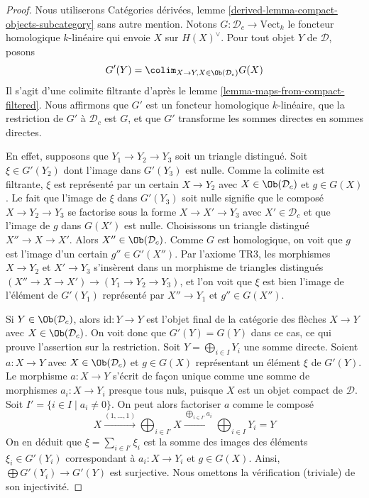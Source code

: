 \begin{proof}
Nous utiliserons Catégories dérivées, lemme
\ref{derived-lemma-compact-objects-subcategory} sans autre mention.
Notons $G : \mathcal{D}_c \to \text{Vect}_k$ le foncteur homologique
$k$-linéaire qui envoie $X$ sur $H(X)^\vee$. Pour tout objet $Y$ de $\mathcal{D}$,
posons
$$
G'(Y) = \colim_{X \to Y, X \in \Ob(\mathcal{D}_c)} G(X)
$$
Il s'agit d'une colimite filtrante d'après le lemme \ref{lemma-maps-from-compact-filtered}.
Nous affirmons que $G'$ est un foncteur homologique $k$-linéaire,
que la restriction de $G'$ à $\mathcal{D}_c$ est $G$, et que $G'$
transforme les sommes directes en sommes directes.

\medskip\noindent
En effet, supposons que $Y_1 \to Y_2 \to Y_3$ soit un triangle distingué.
Soit $\xi \in G'(Y_2)$ dont l'image dans $G'(Y_3)$ est nulle. Comme la colimite est
filtrante, $\xi$ est représenté par un certain $X \to Y_2$ avec
$X \in \Ob(\mathcal{D}_c)$ et $g \in G(X)$.
Le fait que l'image de $\xi$ dans $G'(Y_3)$ soit nulle signifie que le composé
$X \to Y_2 \to Y_3$ se factorise sous la forme $X \to X' \to Y_3$ avec $X' \in \mathcal{D}_c$
et que l'image de $g$ dans $G(X')$ est nulle. Choisissons un triangle distingué
$X'' \to X \to X'$. Alors $X'' \in \Ob(\mathcal{D}_c)$.
Comme $G$ est homologique, on voit que $g$ est l'image d'un certain
$g'' \in G'(X'')$. Par l'axiome TR3, les morphismes $X \to Y_2$ et $X' \to Y_3$ s'insèrent dans
un morphisme de triangles distingués
$(X'' \to X \to X') \to (Y_1 \to Y_2 \to Y_3)$,
et l'on voit que $\xi$ est bien l'image de
l'élément de $G'(Y_1)$ représenté par $X'' \to Y_1$ et $g'' \in G(X'')$.

\medskip\noindent
Si $Y \in \Ob(\mathcal{D}_c)$, alors $\text{id} : Y \to Y$ est l'objet final
de la catégorie des flèches $X \to Y$ avec $X \in \Ob(\mathcal{D}_c)$.
On voit donc que $G'(Y) = G(Y)$ dans ce cas, ce qui prouve l'assertion
sur la restriction. Soit $Y = \bigoplus_{i \in I} Y_i$
une somme directe. Soient $a : X \to Y$ avec $X \in \Ob(\mathcal{D}_c)$
et $g \in G(X)$ représentant un élément $\xi$ de $G'(Y)$.
Le morphisme $a : X \to Y$ s'écrit de façon unique comme une somme de morphismes
$a_i : X \to Y_i$ presque tous nuls, puisque $X$ est un objet compact de $\mathcal{D}$.
Soit $I' = \{i \in I \mid a_i \not = 0\}$. On peut alors factoriser
$a$ comme le composé
$$
X \xrightarrow{(1, \ldots, 1)}
\bigoplus\nolimits_{i \in I'} X
\xrightarrow{\bigoplus_{i \in I'} a_i}
\bigoplus\nolimits_{i \in I} Y_i = Y
$$
On en déduit que $\xi = \sum_{i \in I'} \xi_i$
est la somme des images des éléments
$\xi_i \in G'(Y_i)$ correspondant à $a_i : X \to Y_i$
et $g \in G(X)$. Ainsi, $\bigoplus G'(Y_i) \to G'(Y)$
est surjective. Nous omettons la vérification (triviale) de son injectivité.


\end{proof}

